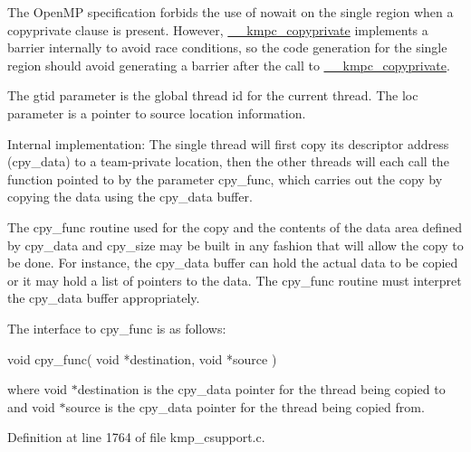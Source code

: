 The Open\-M\-P specification forbids the use of nowait on the single region when a copyprivate clause is present. However, \hyperlink{group__THREADPRIVATE_ga1453eca6136fd77e5de88ea0e78cc7a4}{\-\_\-\-\_\-kmpc\-\_\-copyprivate} implements a barrier internally to avoid race conditions, so the code generation for the single region should avoid generating a barrier after the call to \hyperlink{group__THREADPRIVATE_ga1453eca6136fd77e5de88ea0e78cc7a4}{\-\_\-\-\_\-kmpc\-\_\-copyprivate}.

The {\ttfamily gtid} parameter is the global thread id for the current thread. The {\ttfamily loc} parameter is a pointer to source location information.

Internal implementation\-: The single thread will first copy its descriptor address (cpy\-\_\-data) to a team-\/private location, then the other threads will each call the function pointed to by the parameter cpy\-\_\-func, which carries out the copy by copying the data using the cpy\-\_\-data buffer.

The cpy\-\_\-func routine used for the copy and the contents of the data area defined by cpy\-\_\-data and cpy\-\_\-size may be built in any fashion that will allow the copy to be done. For instance, the cpy\-\_\-data buffer can hold the actual data to be copied or it may hold a list of pointers to the data. The cpy\-\_\-func routine must interpret the cpy\-\_\-data buffer appropriately.

The interface to cpy\-\_\-func is as follows\-: 
\begin{DoxyCode}
\textcolor{keywordtype}{void} cpy\_func( \textcolor{keywordtype}{void} *destination, \textcolor{keywordtype}{void} *source )
\end{DoxyCode}
 where void $\ast$destination is the cpy\-\_\-data pointer for the thread being copied to and void $\ast$source is the cpy\-\_\-data pointer for the thread being copied from. 

Definition at line 1764 of file kmp\-\_\-csupport.\-c.


